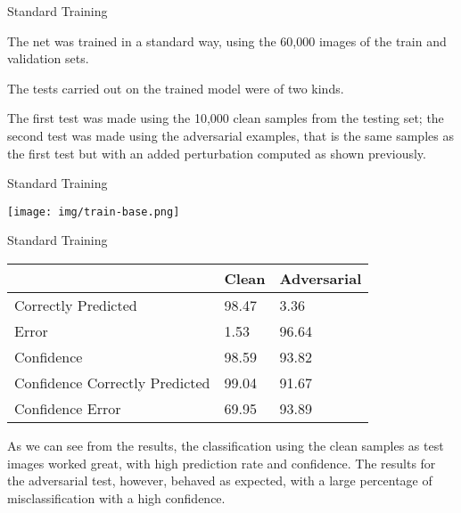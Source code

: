 \begin{tframe}{Standard Training}

The net was trained in a standard way, using the 60,000 images of the train and validation sets.

\vspace{0.1in}

The tests carried out on the trained model were of two kinds. 

\vspace{0.1in}

The first test was made using the 10,000 clean samples from the testing set; the second test was made using the adversarial examples, that is the same samples as the first test but with an added perturbation computed as shown previously.

\end{tframe}

\begin{tframe}{Standard Training}

\begin{center}
  \texttt{[image: img/train-base.png]}
	\label{train-base} 
\end{center}
\end{tframe}

\begin{tframe}{Standard Training}

\begin{table}[h]
\centering
\begin{tabular}{@{}lll@{}}
\toprule
                               & Clean & Adversarial \\ \midrule
Correctly Predicted            & 98.47 & 3.36        \\
Error                          & 1.53  & 96.64       \\
Confidence                     & 98.59 & 93.82       \\
Confidence Correctly Predicted & 99.04 & 91.67       \\
Confidence Error               & 69.95 & 93.89       \\ \bottomrule
\end{tabular}
\end{table}

As we can see from the results, the classification using the clean samples as test images worked great, with high prediction rate and confidence. The results for the adversarial test, however, behaved as expected, with a large percentage of misclassification with a high confidence.

\end{tframe}